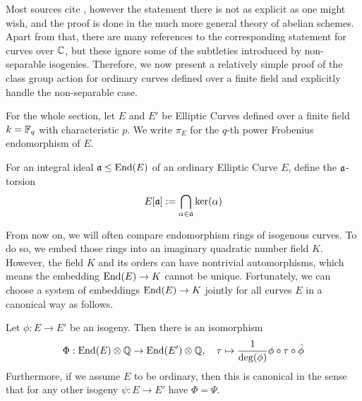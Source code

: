 Most sources cite \cite[Thm~4.5]{class_group_action_waterhouse}, however the statement there is not as explicit as one might wish, and the proof is done in the much more general theory of abelian schemes.
Apart from that, there are many references to the corresponding statement for curves over $\mathbb{C}$, but these ignore some of the subtleties introduced by non-separable isogenies. 
Therefore, we now present a relatively simple proof of the class group action for ordinary curves defined over a finite field and explicitly handle the non-separable case.

For the whole section, let $E$ and $E'$ be Elliptic Curves defined over a finite field $k = \mathbb{F}_q$ with characteristic $p$.
We write $\pi_E$ for the $q$-th power Frobenius endomorphism of $E$.
\begin{definition}
    For an integral ideal $\mathfrak{a} \leq \mathrm{End}(E)$ of an ordinary Elliptic Curve $E$, define the $\mathfrak{a}$-torsion
    \begin{equation*}
        E[\mathfrak{a}] := \bigcap_{\alpha \in \mathfrak{a}} \ker(\alpha)
    \end{equation*}
\end{definition}
From now on, we will often compare endomorphism rings of isogenous curves.
To do so, we embed those rings into an imaginary quadratic number field $K$.
However, the field $K$ and its orders can have nontrivial automorphisms, which means the embedding $\mathrm{End}(E) \to K$ cannot be unique.
Fortunately, we can choose a system of embeddings $\mathrm{End}(E) \to K$ jointly for all curves $E$ in a canonical way as follows.
\begin{lemma}
    Let $\phi: E \to E'$ be an isogeny.
    Then there is an isomorphism
    \begin{equation*}
        \Phi: \mathrm{End}(E) \otimes \mathbb{Q} \to \mathrm{End}(E') \otimes \mathbb{Q}, \quad \tau \mapsto \frac 1 {\deg(\phi)} \phi \circ \tau \circ \hat{\phi}
    \end{equation*}
    Furthermore, if we assume $E$ to be ordinary, then this is canonical in the sense that for any other isogeny $\psi: E \to E'$ have $\Phi = \Psi$.
\end{lemma}
